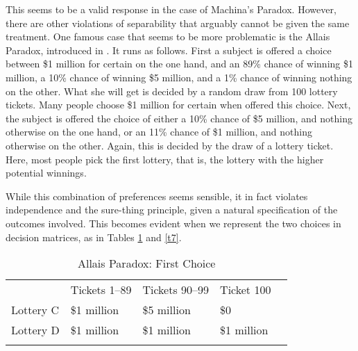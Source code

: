 This seems to be a valid response in the case of Machina's Paradox. However, there are other violations of separability that arguably cannot be given the same treatment. One famous case that seems to be more problematic is the Allais Paradox, introduced in \citet{Allais1953}. It runs as follows. First a subject is offered a choice between \$1 million for certain on the one hand, and an 89\% chance of winning \$1 million, a 10\% chance of winning \$5 million, and a 1\% chance of winning nothing on the other. What she will get is decided by a random draw from 100 lottery tickets. Many people choose \$1 million for certain when offered this choice. Next, the subject is offered the choice of either a 10\% chance of \$5 million, and nothing otherwise on the one hand, or an 11\% chance of \$1 million, and nothing otherwise on the other. Again, this is decided by the draw of a lottery ticket. Here, most people pick the first lottery, that is, the lottery with the higher potential winnings.

While this combination of preferences seems sensible, it in fact violates independence and the sure-thing principle, given a natural specification of the outcomes involved. This becomes evident when we represent the two choices in decision matrices, as in Tables \ref{t6} and \ref{t7}.

\begin{table}[ht]
\centering
\begin{tabular}{lllll}
\cline{2-4}
\multicolumn{1}{l|}{}           & \multicolumn{1}{l|}{Tickets 1--89} & \multicolumn{1}{l|}{Tickets 90--99} & \multicolumn{1}{l|}{Ticket 100}  &  \\ \cline{1-4}
\multicolumn{1}{|l|}{Lottery C} & \multicolumn{1}{l|}{\$1 million}    & \multicolumn{1}{l|}{\$5 million}     & \multicolumn{1}{l|}{\$0}         &  \\ \cline{1-4}
\multicolumn{1}{|l|}{Lottery D} & \multicolumn{1}{l|}{\$1 million}    & \multicolumn{1}{l|}{\$1 million}     & \multicolumn{1}{l|}{\$1 million} &  \\ \cline{1-4}
                                &                                     &                                      &                                  &
\end{tabular}
\caption{Allais Paradox: First Choice}
\label{t6}
\end{table}


